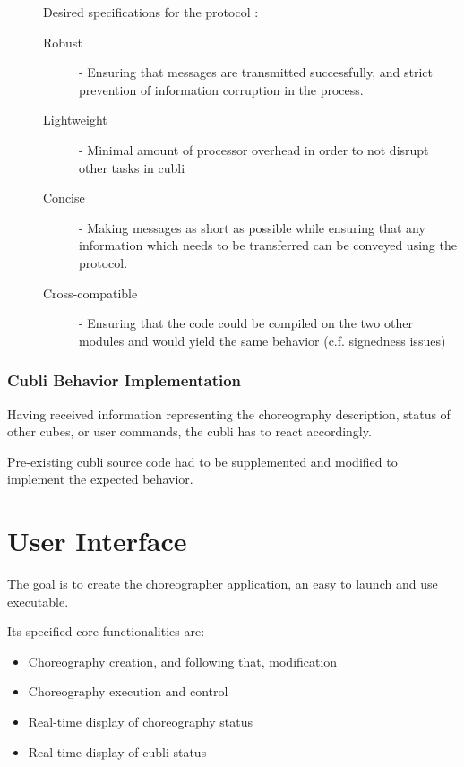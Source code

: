 \begin{description}
\item[] Desired specifications for the protocol :
\begin{description}
  \item[Robust] - Ensuring that messages are transmitted successfully, and    strict prevention of information corruption in the process. 

  \item[Lightweight] - Minimal amount of processor overhead in order to not disrupt other tasks in cubli 

  \item[Concise] - Making messages as short as possible while ensuring that 	any information which needs to be transferred can be conveyed using the 	protocol. 

  \item[Cross-compatible] - Ensuring that the code could be compiled on the 	two other modules and would yield the same behavior (c.f. signedness 	issues) 
\end{description}
\end{description}
 
\subsubsection{Cubli Behavior Implementation}

Having received information representing the choreography description, status of other cubes, or user commands, the cubli has to react accordingly.

Pre-existing cubli source code had to be supplemented and modified to implement the expected behavior.




\section{User Interface}

The goal is to create the choreographer application, an easy to launch and use executable.

Its specified core functionalities are:

\begin{itemize}
\item Choreography creation, and following that, modification
\item Choreography execution and control
\item Real-time display of choreography status
\item Real-time display of cubli status
\end{itemize}

